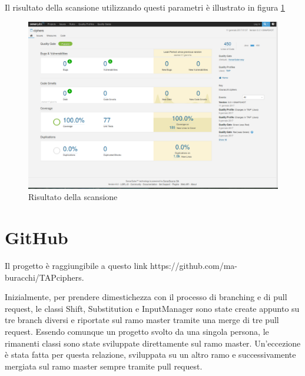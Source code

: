 		Il risultato della scansione utilizzando questi parametri è illustrato in figura \ref{fig:sonaresult}
		
		\begin{figure}[h]
			\centering
			\includegraphics[scale=0.3]{img/sonaresult}
			\caption{Risultato della scansione}
			\label{fig:sonaresult}
		\end{figure}
		
	\section{GitHub}
		Il progetto è raggiungibile a questo link https://github.com/ma-buracchi/TAPciphers. 
		
		Inizialmente, per prendere dimestichezza con il processo di branching e di pull request, le classi Shift, Substitution e InputManager sono state create appunto su tre branch diversi e riportate sul ramo master tramite una merge di tre pull request. Essendo comunque un progetto svolto da una singola persona, le rimanenti classi sono state sviluppate direttamente sul ramo master. Un'eccezione è stata fatta per questa relazione, sviluppata su un altro ramo e successivamente mergiata sul ramo master sempre tramite pull request.
		
		
		